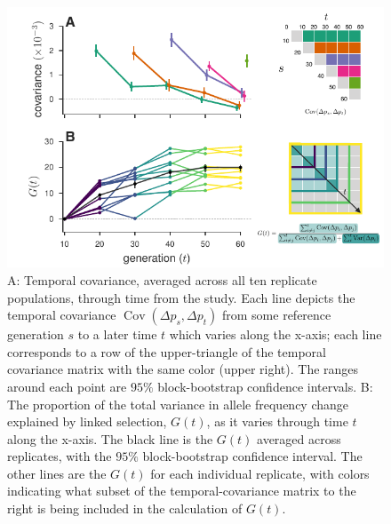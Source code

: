 \documentclass[11pt]{article}
\DeclareMathOperator{\cov}{Cov}
\begin{document}
\begin{figure}[!htb]
  \centering
  \includegraphics[width=\textwidth]{figures/figure-1.pdf}

  \caption{A: Temporal covariance, averaged across all ten replicate
    populations, through time from the \textcite{Barghi2019-qy} study. Each
    line depicts the temporal covariance $\cov(\Delta p_s, \Delta p_t)$ from
    some reference generation $s$ to a later time $t$ which varies along the
    x-axis; each line corresponds to a row of the upper-triangle of the
    temporal covariance matrix with the same color (upper right). The ranges
    around each point are $95\%$ block-bootstrap confidence intervals. B: The
    proportion of the total variance in allele frequency change explained by
    linked selection, $G(t)$, as it varies through time $t$ along the x-axis.
    The black line is the $G(t)$ averaged across replicates, with the $95\%$
    block-bootstrap confidence interval. The other lines are the $G(t)$ for
    each individual replicate, with colors indicating what subset of the
    temporal-covariance matrix to the right is being included in the
  calculation of $G(t)$.}

  \label{fig:figure-1}
\end{figure}
\end{document}
